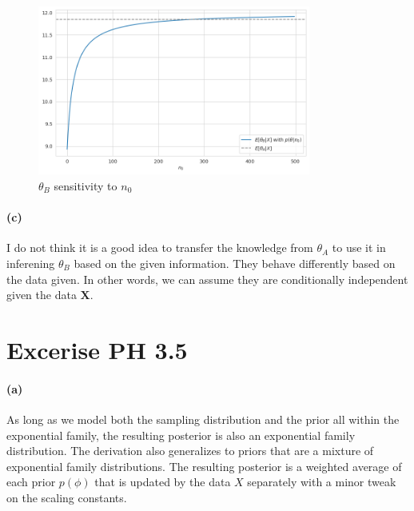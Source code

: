 \documentclass[11pt, letterpaper]{article}
\begin{document}
\begin{figure}[!h]
  \centering
  \includegraphics[width=0.8\textwidth]{3.3.b.png}
  \captionsetup{justification=centering}
  \caption{$\theta_B$ sensitivity to $n_0$}
\end{figure}

\paragraph{(c)}
I do not think it is a good idea to transfer the knowledge from $\theta_A$ to use it in inferening $\theta_B$
based on the given information. They behave differently based on the data given. In other words,
we can assume they are conditionally independent given the data $\mathbf{X}$.
\newpage


\section{Excerise PH 3.5}
\paragraph{(a)}
As long as we model both the sampling distribution and the prior all within the exponential family, the resulting
posterior is also an exponential family distribution. The derivation also generalizes to priors that are
a mixture of exponential family distributions. The resulting posterior is a weighted average
of each prior $p(\phi)$ that is updated by the data $X$ separately with a minor tweak on the scaling constants.
\end{document}
